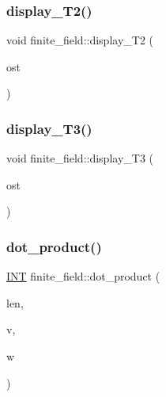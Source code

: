 \subsubsection{\texorpdfstring{display\+\_\+\+T2()}{display\_T2()}}
{\footnotesize\ttfamily void finite\+\_\+field\+::display\+\_\+\+T2 (\begin{DoxyParamCaption}\item[{ostream \&}]{ost }\end{DoxyParamCaption})}

\mbox{\label{classfinite__field_a58abf6314463f2b93247a3c467a7bcd3}} 
\subsubsection{\texorpdfstring{display\+\_\+\+T3()}{display\_T3()}}
{\footnotesize\ttfamily void finite\+\_\+field\+::display\+\_\+\+T3 (\begin{DoxyParamCaption}\item[{ostream \&}]{ost }\end{DoxyParamCaption})}

\mbox{\label{classfinite__field_aeb74732fc0776cb87ec8419e5ea7ad97}} 
\subsubsection{\texorpdfstring{dot\+\_\+product()}{dot\_product()}}
{\footnotesize\ttfamily \mbox{\hyperlink{galois_8h_a09fddde158a3a20bd2dcadb609de11dc}{I\+NT}} finite\+\_\+field\+::dot\+\_\+product (\begin{DoxyParamCaption}\item[{\mbox{\hyperlink{galois_8h_a09fddde158a3a20bd2dcadb609de11dc}{I\+NT}}}]{len,  }\item[{\mbox{\hyperlink{galois_8h_a09fddde158a3a20bd2dcadb609de11dc}{I\+NT}} $\ast$}]{v,  }\item[{\mbox{\hyperlink{galois_8h_a09fddde158a3a20bd2dcadb609de11dc}{I\+NT}} $\ast$}]{w }\end{DoxyParamCaption})}

\mbox{\label{classfinite__field_a0e2f8717bd0d086af9450125be6e3144}} 
